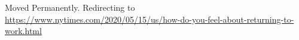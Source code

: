 Moved Permanently. Redirecting to
\url{https://www.nytimes.com/2020/05/15/us/how-do-you-feel-about-returning-to-work.html}
